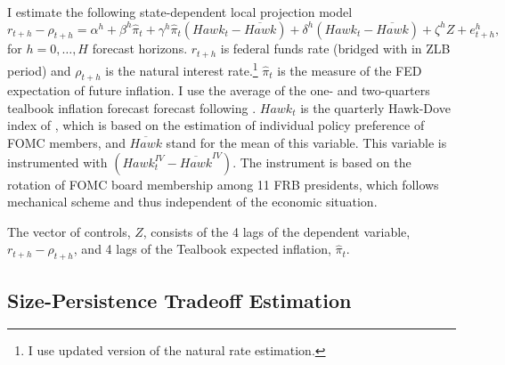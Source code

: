 \documentclass[12pt]{article}
\numberwithin{equation}{section}
\begin{document}
I estimate the following state-dependent local projection model 
\begin{equation}
    r_{t+h}-\rho_{t+h}=\alpha^h+\beta^h \hat\pi_t+\gamma^h \hat\pi_t\left(\mathit{Hawk}_{t}-\overline{\mathit{Hawk}}\right)+\delta^h\left(\mathit{Hawk}_{t}-\overline{\mathit{Hawk}}\right)+\zeta^hZ+e_{t+h}^h,
\end{equation}
for $h=0,\dots, H$ forecast horizons. $r_{t+h}$ is federal funds rate (bridged with \citet{WuXia2016} in ZLB period) and $\rho_{t+h}$ is the \citet{LW2003} natural interest rate.\footnote{I use \citet{HLW2023} updated version of the \citet{LW2003} natural rate estimation.}
$\hat\pi_t$ is the measure of the FED expectation of future inflation. I use the average of the one- and two-quarters  tealbook inflation forecast forecast following \citet{CoibionGorodnichenko2011}. 
$\mathit{Hawk}_t$ is the quarterly Hawk-Dove index of \citet{HIM2023}, which is based on the \citet{Istrefi2019,BordoIstrefi2023} estimation of individual policy preference of FOMC members, and $\overline{\mathit{Hawk}}$ stand for the mean of this variable.
This variable is instrumented with $\left(\mathit{Hawk}_{t}^\mathit{IV}-\overline{\mathit{Hawk}}^\mathit{IV}\right)$. The instrument is based on the rotation of FOMC board membership among 11 FRB presidents, which follows mechanical scheme and thus independent of the economic situation.

The vector of controls, $Z$, consists of the 4 lags of the dependent variable, $r_{t+h}-\rho_{t+h}$, and 4 lags of the Tealbook expected inflation, $\hat\pi_t$.

\subsection{Size-Persistence Tradeoff Estimation}
\end{document}
